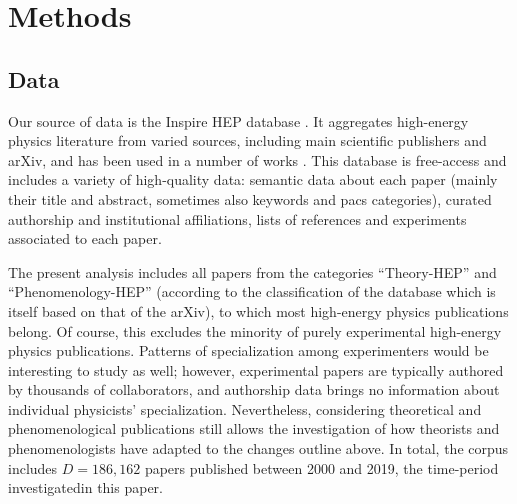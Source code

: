 \documentclass{article}
\begin{document}





\section{\label{sec:methods}Methods}

\subsection{\label{sec:data}Data}

Our source of data is the Inspire HEP database \citep{InspireAPI}. It aggregates high-energy physics literature from varied sources, including main scientific publishers and arXiv, and has been used in a number of works \citep{Perovi2016,Strumia2021,Sikimi2022,Gautheron2023}. This database is free-access and includes a variety of high-quality data: semantic data about each paper (mainly their title and abstract, sometimes also keywords and \gls{pacs} categories), curated authorship and institutional affiliations, lists of references and experiments associated to each paper. %

The present analysis includes all papers from the categories ``Theory-HEP'' and ``Phenomenology-HEP'' (according to the classification of the database which is itself based on that of the arXiv), to which most  high-energy physics publications belong. Of course, this excludes the minority of purely experimental high-energy physics publications. Patterns of specialization among experimenters would be interesting to study as well; however, experimental papers are typically authored by thousands of collaborators, and authorship data brings no information about individual physicists' specialization. Nevertheless, considering theoretical and phenomenological publications still allows the investigation of how theorists and phenomenologists have adapted to the changes outline above. In total, the corpus includes $D=186,162$ papers published between 2000 and 2019, the time-period investigatedin this paper. 
\end{document}
